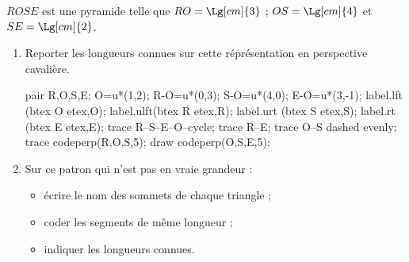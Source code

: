\begin{exercice*}
    $ROSE$ est une pyramide telle que $RO=\Lg[cm]{3}$ ; $OS=\Lg[cm]{4}$ et $SE=\Lg[cm]{2}$.
    \begin{enumerate}
        \item Reporter les longueurs connues sur cette réprésentation en perspective cavalière.
        
        \begin{Geometrie}
            pair R,O,S,E;
            O=u*(1,2);
            R-O=u*(0,3);
            S-O=u*(4,0);
            E-O=u*(3,-1);            
            label.lft (btex O etex,O);
            label.ulft(btex R etex,R);
            label.urt (btex S etex,S);
            label.rt  (btex E etex,E);
            trace R--S--E--O--cycle;
            trace R--E;
            trace O--S dashed evenly;
            trace codeperp(R,O,S,5); draw codeperp(O,S,E,5);
        \end{Geometrie}
        \item Sur ce patron qui n'est pas en vraie grandeur :
        \begin{itemize}
            \item écrire le nom des sommets de chaque triangle ;
            \item coder les segments de même longueur ;
            \item indiquer les longueurs connues.
        \end{itemize}


\end{enumerate}
\end{exercice*}
